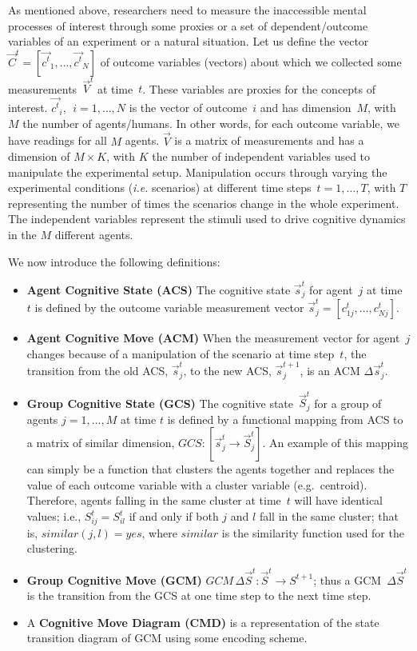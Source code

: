\documentclass[conference]{IEEEtran}
\begin{document}
As mentioned above, researchers need to measure the inaccessible mental processes of interest
through some proxies or a set of dependent/outcome variables of an experiment or a natural
situation. Let us define the vector~$\vec{C}^t = [\vec{c^t}_1, \dots, \vec{c^t}_N]$ of outcome
variables (vectors) about which we collected some measurements~$\vec{V}^t$ at time~$t$. These
variables are proxies for the concepts of interest. $\vec{c^t}_i, \ \ i=1,\dots,N$ is the vector of
outcome~$i$ and has dimension~$M$, with $M$ the number of agents/humans. In other words, for each
outcome variable, we have readings for all $M$ agents. $\vec{V}$ is a matrix of measurements and
has a dimension of $M \times K$, with $K$ the number of independent variables used to manipulate
the experimental setup. Manipulation occurs through varying the experimental conditions ({\it i.e.}
scenarios) at different time steps~$t=1,\dots,T$, with $T$ representing the number of times the
scenarios change in the whole experiment. The independent variables represent the stimuli used to
drive cognitive dynamics in the $M$ different agents.

We now introduce the following definitions:
\begin{itemize}
\item {\bf Agent Cognitive State (ACS)} The cognitive state $\vec{s}^t_j$ for agent~$j$ at time~$t$
is defined by the outcome variable measurement vector $\vec{s}^t_j = [ c^t_{1j}, \dots, c^t_{Nj}]$.
\item {\bf Agent Cognitive Move (ACM)} When the measurement vector for agent~$j$ changes because of
a manipulation of the scenario at time step~$t$, the transition from the old ACS, $\vec{s}^t_j$, to
the new ACS, $\vec{s}^{t+1}_j$, is an ACM $\Delta\vec{s}^{t}_j$.
\item {\bf Group Cognitive State (GCS)} The cognitive state~$\vec{S}^t_j$ for a group of agents
$j=1,\dots,M$ at time $t$ is defined by a functional mapping from ACS to a matrix of similar
dimension, $ GCS: [ \vec{s}^t_j \rightarrow \vec{S}^t_j ]$. An example of this mapping can simply
be a function that clusters the agents together and replaces the value of each outcome variable
with a cluster variable (e.g.\ centroid). Therefore, agents falling in the same cluster at time~$t$
will have identical values; i.e., $S^t_{ij} = S^t_{il} $ if and only if both $j$ and $l$ fall in
the same cluster; that is, $similar(j,l)=yes$, where $similar$ is the similarity function used for
the clustering.
\item {\bf Group Cognitive Move (GCM)}  $GCM\,\Delta\vec{S}^{t}: \vec{S}^t \rightarrow S^{t+1}$;
thus a GCM~$\Delta\vec{S}^{t}$ is the transition from the GCS at one time step to the next time
step.
\item A {\bf Cognitive Move Diagram (CMD)} is a representation of the state transition diagram of
GCM using some encoding scheme.
\end{itemize}
\end{document}
